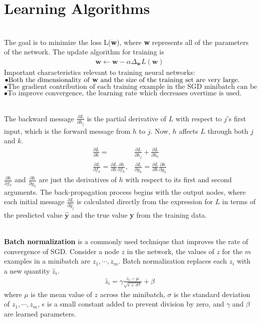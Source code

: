 \documentclass{article}
\begin{document}
\section{Learning Algorithms}
\begin{paragraph}
\\
The goal is to minimize the loss L(\textbf{w}), where \textbf{w} represents all of the parameters of the network. The update algorithm for training is
\begin{align*}
    \textbf{w}\leftarrow\textbf{w}-\alpha\Delta_\textbf{w}L(\textbf{w})
\end{align*}
Important characteristics relevant to training neural networks:
$\bullet \text{Both the dimensionality of \textbf{w} and the size of the training set are very large.}$
$\bullet \text{The gradient contribution of each training example in the SGD minibatch can be computed independently.}$
$\bullet \text{To improve convergence, the learning rate which decreases overtime is used.}$
\end{paragraph}
\begin{paragraph}
\\
The backward message $\frac{\partial L}{\partial h_j}$ is the partial derivative of $L$ with respect to $j$’s first input, which is the forward message from $h$ to $j$. Now, $h$ affects $L$ through both $j$ and $k$.
\begin{align*}
    \frac{\partial L}{\partial h} = & \frac{\partial L}{\partial h_j} + \frac{\partial L}{\partial h_k} \\
    \frac{\partial L}{\partial f_h} = \frac{\partial L}{\partial h}\frac{\partial h}{\partial f_h},&\frac{\partial L}{\partial g_h} = \frac{\partial L}{\partial h}\frac{\partial h}{\partial g_h}
\end{align*}
$\frac{\partial h}{\partial f_h}$ and $\frac{\partial h}{\partial g_h}$ are just the derivatives of $h$ with respect to its first and second arguments. The back-propagation process begins with the output nodes, where each initial message $\frac{\partial L}{\partial\hat{y}_j}$ is calculated directly from the expression for $L$ in terms of the predicted value $\mathbf{\hat{y}}$ and the true value \textbf{y} from the training data.
\end{paragraph}
\begin{paragraph}
\\
\textbf{Batch normalization} is a commonly used technique that improves the rate of convergence of SGD. Consider a node $z$ in the network, the values of $z$ for the $m$ examples in a minibatch are $z_1,\cdots,z_m$. Batch normalization replaces each $z_i$ with a new quantity $\hat{z}_i$.
\begin{align*}
    \hat{z}_i = \gamma\frac{z_i - \mu}{\sqrt{\epsilon+\sigma^2}}+\beta
\end{align*}
where $\mu$ is the mean value of $z$ across the minibatch, $\sigma$ is the standard deviation of $z_1,\cdots,z_m$, $\epsilon$ is a small constant added to prevent division by zero, and $\gamma$ and $\beta$ are learned parameters.
\end{paragraph}
\end{document}

